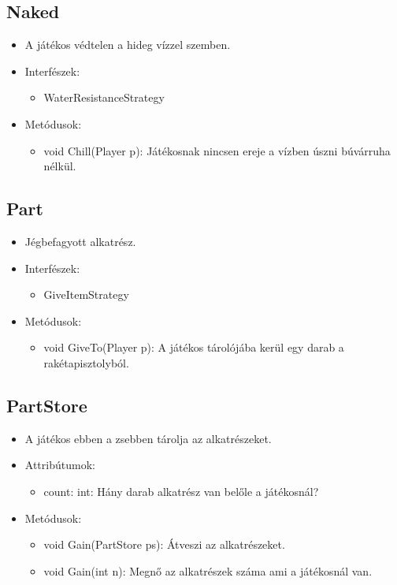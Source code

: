 \subsection{Naked}
\begin{itemize}
	\item A játékos védtelen a hideg vízzel szemben.
	
\item Interfészek:
\begin{itemize}
	\item WaterResistanceStrategy
\end{itemize}
\item Metódusok:
\begin{itemize}
	\item void Chill(Player p): Játékosnak nincsen ereje a vízben úszni búvárruha nélkül.
\end{itemize}
\end{itemize}

\subsection{Part}
\begin{itemize}
	\item Jégbefagyott alkatrész.

\item Interfészek:
\begin{itemize}
	\item GiveItemStrategy
\end{itemize}

\item Metódusok:
\begin{itemize}
	\item void GiveTo(Player p): A játékos tárolójába kerül egy darab a rakétapisztolyból.
\end{itemize}
\end{itemize}

\subsection{PartStore}
\begin{itemize}
	\item A játékos ebben a zsebben tárolja az alkatrészeket.
	
\item Attribútumok:
\begin{itemize}
	\item count: int: Hány darab alkatrész van belőle a játékosnál?
\end{itemize}
\item Metódusok:
\begin{itemize}
	\item void Gain(PartStore ps): Átveszi az alkatrészeket.
	\item void Gain(int n): Megnő az alkatrészek száma ami a játékosnál van.
\end{itemize}
\end{itemize}

